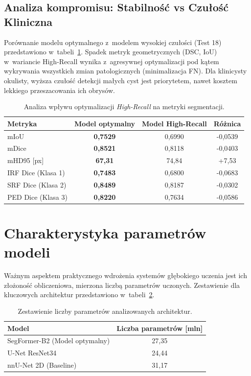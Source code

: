 \documentclass[12pt,a4paper,oneside]{report}
\begin{document}
\subsection{Analiza kompromisu: Stabilność vs Czułość Kliniczna}
Porównanie modelu optymalnego z~modelem wysokiej czułości (Test 18) przedstawiono w~tabeli~\ref{tab:test11_vs_test18}. Spadek metryk geometrycznych (DSC, IoU) w~wariancie High-Recall wynika z~agresywnej optymalizacji pod kątem wykrywania wszystkich zmian patologicznych (minimalizacja FN). Dla klinicysty okulisty, wyższa czułość detekcji małych cyst jest priorytetem, nawet kosztem lekkiego przeszacowania ich obrysów.

\begin{table}[htbp]
 \centering
 \caption{Analiza wpływu optymalizacji \textit{High-Recall} na metryki segmentacji.}
 \label{tab:test11_vs_test18}
 \begin{tabular}{lccc}
 \toprule
 Metryka & Model optymalny & Model High-Recall & Różnica \\
 \midrule
 mIoU & \textbf{0,7529} & 0,6990 & -0,0539 \\
 mDice & \textbf{0,8521} & 0,8118 & -0,0403 \\
 mHD95 [px] & \textbf{67,31} & 74,84 & +7,53 \\
 \midrule
 IRF Dice (Klasa 1) & \textbf{0,7483} & 0,6800 & -0,0683 \\
 SRF Dice (Klasa 2) & \textbf{0,8489} & 0,8187 & -0,0302 \\
 PED Dice (Klasa 3) & \textbf{0,8220} & 0,7634 & -0,0586 \\
 \bottomrule
 \end{tabular}
\end{table}

\section{Charakterystyka parametrów modeli}

Ważnym aspektem praktycznego wdrożenia systemów głębokiego uczenia jest ich złożoność obliczeniowa, mierzona liczbą parametrów uczonych. Zestawienie dla kluczowych architektur przedstawiono w~tabeli~\ref{tab:performance_stats}. 

\begin{table}[htbp]
    \centering
    \caption{Zestawienie liczby parametrów analizowanych architektur.}
    \label{tab:performance_stats}
    \begin{tabular}{lc}
        \toprule
        Model & Liczba parametrów [mln] \\
        \midrule
        SegFormer-B2 (Model optymalny) & 27,35 \\
        U-Net ResNet34 & 24,44 \\
        nnU-Net 2D (Baseline) & 31,17 \\
        \bottomrule
    \end{tabular}
\end{table}
\end{document}
